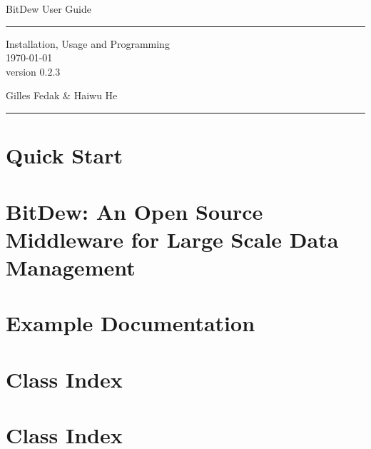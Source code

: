 \documentclass[a4paper]{book}
\begin{document}
\hypersetup{pageanchor=false}
\begin{titlepage}
\vspace*{2cm}
\null\vfil
\begin{flushleft}
  \huge BitDew User Guide
\end{flushleft}
\par
\hrule height 4pt
\par
\begin{flushright}
  \LARGE Installation, Usage and Programming \\
\large \today\\
 version 0.2.3 \\
\par
\end{flushright}
\vfil\null
\vspace*{8cm}
\begin{flushleft}
\huge Gilles Fedak \& Haiwu He
\end{flushleft}
\par
\hrule height 4pt
\par
\normalsize
\end{titlepage}
\clearemptydoublepage
{}
\tableofcontents
\clearemptydoublepage
{}
\hypersetup{pageanchor=true}
\chapter{Quick Start}
\label{index}\hypertarget{index}{}
\chapter{BitDew: An Open Source Middleware for Large Scale Data Management}



\chapter{Example Documentation}




\chapter{Class Index}


\chapter{Class Index}

\end{document}
